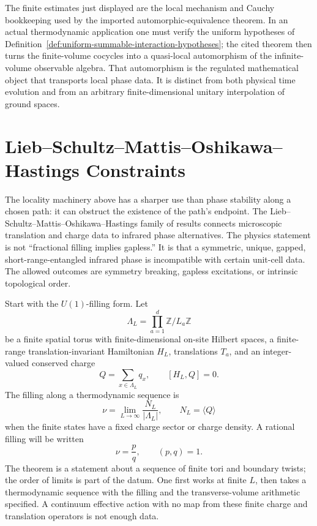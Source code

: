 The finite estimates just displayed are the local mechanism and Cauchy
bookkeeping used by the imported automorphic-equivalence theorem.  In an
actual thermodynamic application one must verify the uniform hypotheses of
Definition~\ref{def:uniform-summable-interaction-hypotheses}; the cited theorem
then turns the finite-volume cocycles into a quasi-local automorphism of the
infinite-volume observable algebra.  That automorphism is the regulated
mathematical object that transports local phase data.  It is distinct from both
physical time evolution and from an arbitrary finite-dimensional unitary
interpolation of ground spaces.

\section{Lieb--Schultz--Mattis--Oshikawa--Hastings Constraints}
\label{sec:lsmoh-lattice-qft-constraints}

The locality machinery above has a sharper use than phase stability along a
chosen path: it can obstruct the existence of the path's endpoint.  The
Lieb--Schultz--Mattis--Oshikawa--Hastings family of results
\cite{LiebSchultzMattis1961,Oshikawa2000Commensurability,Hastings2004LSMHigher}
connects microscopic translation and charge data to infrared phase
alternatives.  The physics statement is not ``fractional filling implies
gapless.''  It is that a symmetric, unique, gapped, short-range-entangled
infrared phase is incompatible with certain unit-cell data.  The allowed
outcomes are symmetry breaking, gapless excitations, or intrinsic topological
order.

Start with the \(U(1)\)-filling form.  Let
\[
  \Lambda_L=\prod_{a=1}^d\mathbb Z/L_a\mathbb Z
\]
be a finite spatial torus with finite-dimensional on-site Hilbert spaces, a
finite-range translation-invariant Hamiltonian \(H_L\), translations \(T_a\),
and an integer-valued conserved charge
\[
  Q=\sum_{x\in\Lambda_L} q_x,\qquad [H_L,Q]=0 .
\]
The filling along a thermodynamic sequence is
\[
  \nu=\lim_{L\to\infty}\frac{N_L}{|\Lambda_L|},
  \qquad N_L=\langle Q\rangle
\]
when the finite states have a fixed charge sector or charge density.  A
rational filling will be written
\[
  \nu=\frac pq,\qquad (p,q)=1.
\]
The theorem is a statement about a sequence of finite tori and boundary twists;
the order of limits is part of the datum.  One first works at finite \(L\),
then takes a thermodynamic sequence with the filling and the transverse-volume
arithmetic specified.  A continuum effective action with no map from these
finite charge and translation operators is not enough data.

